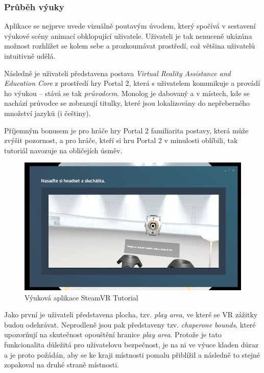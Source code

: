 \subsubsection{Průběh výuky}\label{prux16fbux11bh-vuxfduky}

Aplikace se nejprve uvede vizuálně poutavým úvodem, který spočívá v
sestavení výukové scény animací obklopující uživatele. Uživateli je tak nenuceně
ukázána možnost rozhlížet se kolem sebe a prozkoumávat prostředí, což
většina uživatelů intuitivně udělá.

Následně je uživateli představena postava \emph{Virtual Reality
Assistance and Education Core} z prostředí hry Portal 2, která s uživatelem
komunikuje a provádí ho výukou -- stává se tak \emph{průvodcem}. Monolog
je dabovaný a v místech, kde se nachází průvodce se zobrazují titulky,
které jsou lokalizovány do nepřeberného množství jazyků (i češtiny).

Příjemným bonusem je pro hráče hry Portal 2 familiarita postavy, která
může zvýšit pozornost, a pro hráče, kteří si hru Portal 2 v
minulosti oblíbili, tak tutoriál navozuje na obličejích úsměv.

\begin{figure}[h!]
\centering
\includegraphics[width=12cm]{src/assets/steamvr-tutorial.png}
\caption{Výuková aplikace SteamVR Tutorial}
\end{figure}

Jako první je uživateli představena plocha, tzv. \emph{play area}, ve
které se VR zážitky budou odehrávat. Neprodleně jsou pak představeny
tzv. \emph{chaperone bounds}, které upozorňují na skutečnost opouštění 
hranice \emph{play area}. Protože je tato funkcionalita
důležitá pro uživatelovu bezpečnost, je na ni ve výuce kladen důraz a je proto
požádán, aby se ke kraji místnosti pomalu přiblížil a následně to stejné
zopakoval na druhé straně místnosti.

